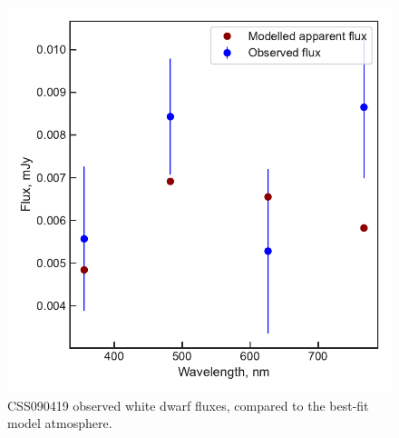 \begin{figure}
    \centering
    \includegraphics[width=\textwidth]{figures/results/CSS090419/fluxplot.pdf}
    \caption{CSS090419 observed white dwarf fluxes, compared to the best-fit model atmosphere.}
    \label{fig:CSS090419 flux plot}
\end{figure}
\clearpage


